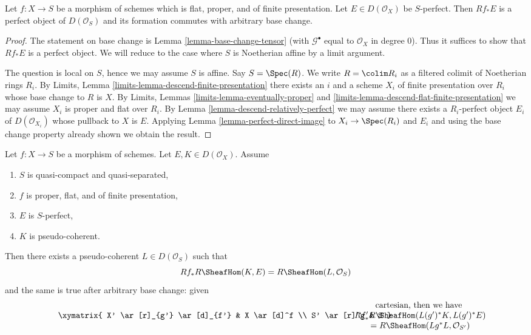 \begin{lemma}
\label{lemma-derived-pushforward-rel-perfect}
Let $f : X \to S$ be a morphism of schemes which is flat, proper, and
of finite presentation. Let $E \in D(\mathcal{O}_X)$ be $S$-perfect.
Then $Rf_*E$ is a perfect object of $D(\mathcal{O}_S)$
and its formation commutes with arbitrary base change.
\end{lemma}

\begin{proof}
The statement on base change is Lemma \ref{lemma-base-change-tensor}
(with $\mathcal{G}^\bullet$ equal to $\mathcal{O}_X$ in degree $0$).
Thus it suffices to show that $Rf_*E$ is a perfect object. We will reduce
to the case where $S$ is Noetherian affine by a limit argument.

\medskip\noindent
The question is local on $S$, hence we may assume $S$ is affine.
Say $S = \Spec(R)$. We write $R = \colim R_i$ as a filtered colimit
of Noetherian rings $R_i$. By Limits, Lemma
\ref{limits-lemma-descend-finite-presentation}
there exists an $i$ and a scheme $X_i$ of finite presentation over $R_i$
whose base change to $R$ is $X$. By
Limits, Lemmas \ref{limits-lemma-eventually-proper} and
\ref{limits-lemma-descend-flat-finite-presentation}
we may assume $X_i$ is proper and flat over $R_i$.
By Lemma \ref{lemma-descend-relatively-perfect}
we may assume there exists a $R_i$-perfect object $E_i$ of
$D(\mathcal{O}_{X_i})$ whose pullback to $X$ is $E$.
Applying Lemma \ref{lemma-perfect-direct-image}
to $X_i \to \Spec(R_i)$ and $E_i$ and using the
base change property already shown we obtain the result.
\end{proof}

\begin{lemma}
\label{lemma-compute-ext-rel-perfect}
Let $f : X \to S$ be a morphism of schemes. Let $E, K \in D(\mathcal{O}_X)$.
Assume
\begin{enumerate}
\item $S$ is quasi-compact and quasi-separated,
\item $f$ is proper, flat, and of finite presentation,
\item $E$ is $S$-perfect,
\item $K$ is pseudo-coherent.
\end{enumerate}
Then there exists a pseudo-coherent $L \in D(\mathcal{O}_S)$ such that
$$
Rf_*R\SheafHom(K, E) = R\SheafHom(L, \mathcal{O}_S)
$$
and the same is true after arbitrary base change: given
$$
\vcenter{
\xymatrix{
X' \ar[r]_{g'} \ar[d]_{f'} &
X \ar[d]^f \\
S' \ar[r]^g &
S
}
}
\quad\quad
\begin{matrix}
\text{cartesian, then we have } \\
Rf'_*R\SheafHom(L(g')^*K, L(g')^*E) \\
= R\SheafHom(Lg^*L, \mathcal{O}_{S'})
\end{matrix}
$$
\end{lemma}

